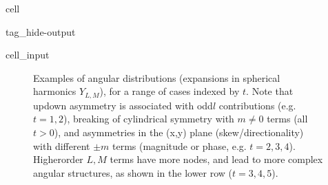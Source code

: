 \documentclass[letterpaper,table,10pt,english]{jupyterBook}
\begin{document}
\begin{sphinxuseclass}{cell}
\begin{sphinxuseclass}{tag_hide-output}\begin{sphinxVerbatimInput}

\begin{sphinxuseclass}{cell_input}
\begin{sphinxVerbatim}[commandchars=\\\{\}]

  \PYG{p}{[}\PYG{p}{]}  

         
\end{sphinxVerbatim}

\end{sphinxuseclass}\end{sphinxVerbatimInput}

\end{sphinxuseclass}
\end{sphinxuseclass}
\begin{figure}[htbp]
\centering
\capstart

\noindent{}
\caption{Examples of angular distributions (expansions in spherical harmonics \(Y_{L,M}\)), for a range of cases indexed by \(t\). Note that up\sphinxhyphen{}down asymmetry is associated with odd\sphinxhyphen{}\(l\) contributions (e.g. \(t=1,2\)), breaking of cylindrical symmetry with \(m\neq0\) terms (all \(t>0\)), and asymmetries in the (x,y) plane (skew/directionality) with different \(\pm m\) terms (magnitude or phase, e.g. \(t=2,3,4\)). Higher\sphinxhyphen{}order \(L,M\) terms have more nodes, and lead to more complex angular structures, as shown in the lower row (\(t=3,4,5\)).}\label{\detokenize{part1/theory_observables_intro_100723:fig-pads-example}}\end{figure}
\end{document}
